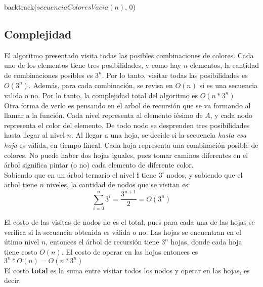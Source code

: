 \begin{algorithm}[H]
\begin{algorithmic}
  \State backtrack($secuenciaColoresVacia(n)$, $0$)
\EndProcedure
\end{algorithmic}
\end{algorithm}


\subsection{Complejidad}

El algoritmo presentado visita todas las posibles combinaciones de colores. Cada uno de los elementos tiene tres posibilidades, y como hay $n$ elementos, la cantidad de combinaciones posibles es $3^{n}$. Por lo tanto, visitar todas las posibilidades es $O(3^{n})$. Además, para cada combinación, se revisa en $O(n)$ si es una secuencia valida o no. Por lo tanto, la complejidad total del algoritmo es $O(n * 3^{n})$ \\

Otra forma de verlo es pensando en el arbol de recursión que se va formando al llamar a la función. Cada nivel representa al elemento iésimo de $A$, y cada nodo representa el color del elemento. De todo nodo se desprenden tres posibilidades hasta llegar al nivel $n$. Al llegar a una hoja, se decide si la secuencia \textit{hasta esa hoja} es válida, en tiempo lineal. Cada hoja representa una combinación posible de colores. No puede haber dos hojas iguales, pues tomar caminos diferentes en el árbol significa pintar (o no) cada elemento de diferente color. \\

Sabiendo que en un árbol ternario el nivel \textbf{i} tiene $3^{i}$ nodos, y sabiendo que el arbol tiene $n$ niveles, la cantidad de nodos que se visitan es: \\

$$\sum_{i = 0}^{n} 3^{i} = \frac{3^{n+1}}{2} = O(3^n)$$

El costo de las visitas de nodos no es el total, pues para cada una de las hojas se verifica si la secuencia obtenida es válida o no. Las hojas se encuentran en el útimo nivel $n$, entonces el árbol de recursión tiene $3^n$ hojas, donde cada hoja tiene costo $O(n)$. El costo de operar en las hojas entonces es $3^n * O(n) = O(n * 3^n)$ \\

El costo \textbf{total} es la suma entre visitar todos los nodos y operar en las hojas, es decir:


